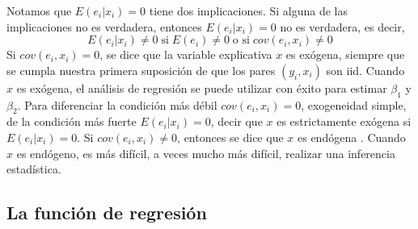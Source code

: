 Notamos que $E ( e_i | x_i ) = 0$ tiene dos implicaciones. Si alguna de las implicaciones no es verdadera, entonces $E ( e_i | x_i ) = 0$ no es verdadera, es decir,
$$E(e_i|x_i) \neq 0 \; \mbox{si}\; E(e_i)\neq 0\; \mbox{o si}\; cov(e_i,x_i)\neq 0$$
Si $cov ( e_i , x_i ) = 0$, se dice que la variable explicativa $x$ es exógena, siempre que se cumpla nuestra primera suposición de que los pares $(y_i, x_i)$ son iid. Cuando $x$ es exógena, el análisis de regresión se puede utilizar con éxito para estimar $\beta_1$ y $\beta_2$. Para diferenciar la condición más débil $cov ( e_i , x_i ) = 0$, exogeneidad simple, de la condición más fuerte $E ( e_i | x_i ) = 0$, decir que $x$ es estrictamente exógena si $E ( e_i | x_i ) = 0$. Si $cov( e_i , x_i ) \neq  0$, entonces se dice que $x$ es endógena . Cuando $x$ es endógeno, es más difícil, a veces mucho más difícil, realizar una inferencia estadística.

\subsection{La función de regresión}
